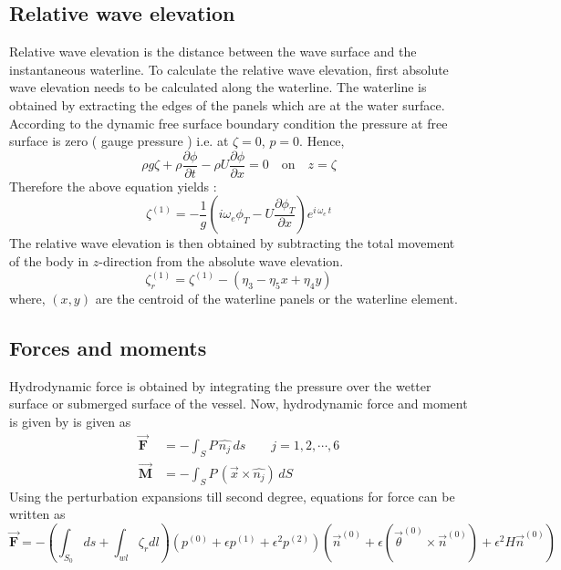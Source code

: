 \subsection{Relative wave elevation}
Relative wave elevation is the distance between the wave surface and the instantaneous waterline. To calculate the
relative wave elevation, first absolute wave elevation needs to be calculated along the waterline. The waterline is obtained 
by extracting the edges of the panels which are at the water surface. According to the dynamic free surface boundary 
condition the pressure at free surface is zero ( gauge pressure ) i.e. at $\zeta=0$, $p=0$. Hence, 
\begin{equation}
    \rho g \zeta + \rho\frac{\partial \phi}{\partial t} - \rho U \frac{\partial \phi}{\partial x} =0 \quad \text{on} \quad z=\zeta 
\end{equation}
Therefore the above equation yields :
\begin{equation}
    \zeta^{(1)} = -\frac{1}{g}\left(i\omega_e \phi_T - U\frac{\partial \phi_T}{\partial x}\right) e^{i\,\omega_e\,t}
\end{equation}
The relative wave elevation is  then obtained by subtracting the total movement of the body in $z$-direction from the
absolute wave elevation.
\begin{equation}
    \label{eq:rel_wave_ele}
    \zeta^{(1)}_r =\zeta^{(1)} - (\eta_3 - \eta_5x + \eta_4y)
\end{equation}
where, $(x, y)$ are the centroid of the waterline panels or the waterline element.


\subsection{Forces and moments}
Hydrodynamic force is obtained by integrating the pressure over the wetter surface
or submerged surface of the vessel. Now, hydrodynamic force and moment is 
given by is given as 
\begin{align}
    \boldsymbol{\vec{F}} &= -\int_S P\,\hat{n_j}\,ds \quad \quad j=1, 2,\cdots, 6 \\
    \boldsymbol{\vec{M}} &= -\int_S P\,(\vec{x}\times \hat{n_j})\,dS
\end{align}
Using the perturbation expansions till second degree, equations for force can 
be written as
\begin{equation}
    \label{eq:per_force}
    \boldsymbol{\vec{F}} = -\left(\int_{S_0}ds+\int_{wl}\zeta_r dl\right)(p^{(0)} + \epsilon p^{(1)} +
    \epsilon^2 p^{(2)}) (\vec{n}^{(0)}+\epsilon(\vec{\theta}^{(0)} \times \vec{n}^{(0)})+\epsilon^2H\vec{n}^{(0)})
\end{equation} 


